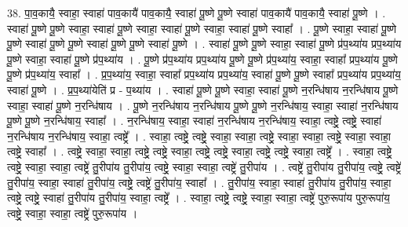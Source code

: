 \documentclass[17pt]{extarticle}
\begin{document}
38. पा॒व॒कायै॒ स्वाहा॒ स्वाहा॑ पाव॒कायै॑ पाव॒कायै॒ स्वाहा॑ पू॒ष्णे पू॒ष्णे स्वाहा॑ पाव॒कायै॑ पाव॒कायै॒ स्वाहा॑ पू॒ष्णे । . स्वाहा॑ पू॒ष्णे पू॒ष्णे स्वाहा॒ स्वाहा॑ पू॒ष्णे स्वाहा॒ स्वाहा॑ पू॒ष्णे स्वाहा॒ स्वाहा॑ पू॒ष्णे स्वाहा᳚ । . पू॒ष्णे स्वाहा॒ स्वाहा॑ पू॒ष्णे पू॒ष्णे स्वाहा॑ पू॒ष्णे पू॒ष्णे स्वाहा॑ पू॒ष्णे पू॒ष्णे स्वाहा॑ पू॒ष्णे । . स्वाहा॑ पू॒ष्णे पू॒ष्णे स्वाहा॒ स्वाहा॑ पू॒ष्णे प्र॑प॒थ्या॑य प्रप॒थ्या॑य पू॒ष्णे स्वाहा॒ स्वाहा॑ पू॒ष्णे प्र॑प॒थ्या॑य । . पू॒ष्णे प्र॑प॒थ्या॑य प्रप॒थ्या॑य पू॒ष्णे पू॒ष्णे प्र॑प॒थ्या॑य॒ स्वाहा॒ स्वाहा᳚ प्रप॒थ्या॑य पू॒ष्णे पू॒ष्णे प्र॑प॒थ्या॑य॒ स्वाहा᳚ । . प्र॒प॒थ्या॑य॒ स्वाहा॒ स्वाहा᳚ प्रप॒थ्या॑य प्रप॒थ्या॑य॒ स्वाहा॑ पू॒ष्णे पू॒ष्णे स्वाहा᳚ प्रप॒थ्या॑य प्रप॒थ्या॑य॒ स्वाहा॑ पू॒ष्णे । . प्र॒प॒थ्या॑येति॑ प्र - प॒थ्या॑य । . स्वाहा॑ पू॒ष्णे पू॒ष्णे स्वाहा॒ स्वाहा॑ पू॒ष्णे न॒रन्धि॑षाय न॒रन्धि॑षाय पू॒ष्णे स्वाहा॒ स्वाहा॑ पू॒ष्णे न॒रन्धि॑षाय । . पू॒ष्णे न॒रन्धि॑षाय न॒रन्धि॑षाय पू॒ष्णे पू॒ष्णे न॒रन्धि॑षाय॒ स्वाहा॒ स्वाहा॑ न॒रन्धि॑षाय पू॒ष्णे पू॒ष्णे न॒रन्धि॑षाय॒ स्वाहा᳚ । . न॒रन्धि॑षाय॒ स्वाहा॒ स्वाहा॑ न॒रन्धि॑षाय न॒रन्धि॑षाय॒ स्वाहा॒ त्वष्ट्रे॒ त्वष्ट्रे॒ स्वाहा॑ न॒रन्धि॑षाय न॒रन्धि॑षाय॒ स्वाहा॒ त्वष्ट्रे᳚ । . स्वाहा॒ त्वष्ट्रे॒ त्वष्ट्रे॒ स्वाहा॒ स्वाहा॒ त्वष्ट्रे॒ स्वाहा॒ स्वाहा॒ त्वष्ट्रे॒ स्वाहा॒ स्वाहा॒ त्वष्ट्रे॒ स्वाहा᳚ । . त्वष्ट्रे॒ स्वाहा॒ स्वाहा॒ त्वष्ट्रे॒ त्वष्ट्रे॒ स्वाहा॒ त्वष्ट्रे॒ त्वष्ट्रे॒ स्वाहा॒ त्वष्ट्रे॒ त्वष्ट्रे॒ स्वाहा॒ त्वष्ट्रे᳚ । . स्वाहा॒ त्वष्ट्रे॒ त्वष्ट्रे॒ स्वाहा॒ स्वाहा॒ त्वष्ट्रे॑ तु॒रीपा॑य तु॒रीपा॑य॒ त्वष्ट्रे॒ स्वाहा॒ स्वाहा॒ त्वष्ट्रे॑ तु॒रीपा॑य । . त्वष्ट्रे॑ तु॒रीपा॑य तु॒रीपा॑य॒ त्वष्ट्रे॒ त्वष्ट्रे॑ तु॒रीपा॑य॒ स्वाहा॒ स्वाहा॑ तु॒रीपा॑य॒ त्वष्ट्रे॒ त्वष्ट्रे॑ तु॒रीपा॑य॒ स्वाहा᳚ । . तु॒रीपा॑य॒ स्वाहा॒ स्वाहा॑ तु॒रीपा॑य तु॒रीपा॑य॒ स्वाहा॒ त्वष्ट्रे॒ त्वष्ट्रे॒ स्वाहा॑ तु॒रीपा॑य तु॒रीपा॑य॒ स्वाहा॒ त्वष्ट्रे᳚ । . स्वाहा॒ त्वष्ट्रे॒ त्वष्ट्रे॒ स्वाहा॒ स्वाहा॒ त्वष्ट्रे॑ पुरु॒रूपा॑य पुरु॒रूपा॑य॒ त्वष्ट्रे॒ स्वाहा॒ स्वाहा॒ त्वष्ट्रे॑ पुरु॒रूपा॑य । \newline
\end{document}
